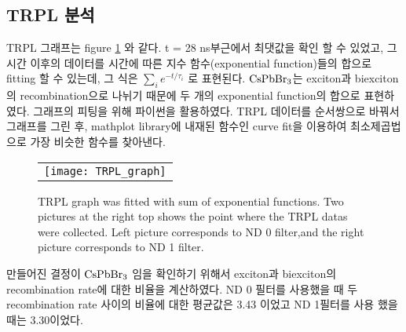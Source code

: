 \subsection{TRPL 분석}
TRPL 그래프는 figure \ref{fig:FIR105} 와 같다. t = 28 ns부근에서 최댓값을 확인 할 수 있었고, 그 시간 이후의 데이터를 시간에 따른 지수 함수(exponential function)들의 합으로 fitting 할 수 있는데, 그 식은 $\sum_{i}^{} {e}^{-t/{\tau}_{i}}$ 로 표현된다. $\rm{CsPbBr_3}$는 exciton과 biexciton의 recombination으로 나뉘기 때문에 두 개의 exponential function의 합으로 표현하였다. 그래프의 피팅을 위해 파이썬을 활용하였다. TRPL 데이터를 순서쌍으로 바꿔서 그래프를 그린 후, mathplot library에 내재된 함수인 curve fit을 이용하여 최소제곱법으로 가장 비슷한 함수를 찾아낸다.
\begin{figure}[h]
	\begin{center}
		\begin{tabular}{c}
			\texttt{[image: TRPL\_graph]}
		\end{tabular}
		\caption{TRPL graph was fitted with sum of exponential functions. Two pictures at the right top shows the point where the TRPL datas were collected. Left picture corresponds to ND 0 filter,and the right picture corresponds to ND 1 filter. }	
		\label{fig:FIR105}
	\end{center}
\end{figure}
 만들어진 결정이 $\rm{CsPbBr_3}$ 임을 확인하기 위해서 exciton과 biexciton의 recombination rate에 대한 비율을 계산하였다. ND 0 필터를 사용했을 때 두 recombination rate 사이의 비율에 대한 평균값은 3.43 이었고 ND 1필터를 사용 했을 때는 3.30이었다.
